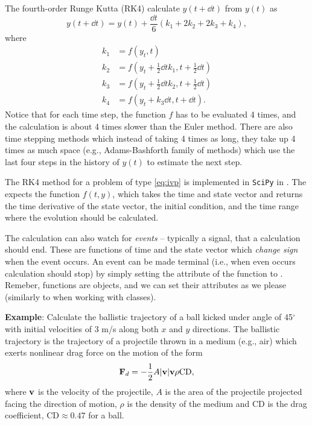 The fourth-order Runge Kutta (RK4) calculate $y(t + \dd t)$ from $y(t)$ as
\begin{equation}
    \label{eq:RK4} %
    y(t + \dd t) = y(t) + \frac{\dd t}{6}\left(k_1 + 2k_2 + 2k_3 + k_4\right),
\end{equation}
where
\begin{equation}
    \begin{aligned}
        k_1 &= f(y_t, t)\\
        k_2 &= f\left(y_t + \frac{1}{2}\dd t k_1, t + \frac{1}{2}\dd t\right)\\
        k_3 &= f\left(y_t + \frac{1}{2}\dd t k_2, t + \frac{1}{2}\dd t\right)\\
        k_4 &= f(y_t + k_3 \dd t, t + \dd t).
    \end{aligned}
\end{equation}
Notice that for each time step, the function $f$ has to be evaluated 4 times, and the calculation is about 4 times slower than the Euler method. There are also time stepping methods which instead of taking 4 times as long, they take up 4 times as much space (e.g., Adams-Bashforth family of methods) which use the last four steps in the history of $y(t)$ to estimate the next step.

The RK4 method for a problem of type \eqref{eq:ivp} is implemented in \verb|SciPy| in . The  expects the function $f(t, y)$, which takes the time and state vector and returns the time derivative of the state vector, the initial condition, and the time range where the evolution should be calculated.

The calculation can also watch for \emph{events} -- typically a signal, that a calculation should end. These are functions of time and the state vector which \emph{change sign} when the event occurs. An event can be made terminal (i.e., when even occurs calculation should stop) by simply setting the  attribute of the function to . Remeber, functions are objects, and we can set their attributes as we please (similarly to  when working with classes).

\textbf{Example}: Calculate the ballistic trajectory of a ball kicked under angle of 45$^\circ$ with initial velocities of 3 m/s along both $x$ and $y$ directions. The ballistic trajectory is the trajectory of a projectile thrown in a medium (e.g., air) which exerts nonlinear drag force on the motion of the form
\begin{equation}
    \mathbf{F}_d = -\frac{1}{2}A|\mathbf{v}|\mathbf{v} \rho \mathrm{CD},
\end{equation}
where $\mathbf{v}$ is the velocity of the projectile, $A$ is the area of the projectile projected facing the direction of motion, $\rho$ is the density of the medium and CD is the drag coefficient, $\mathrm{CD}\approx0.47$ for a ball.

